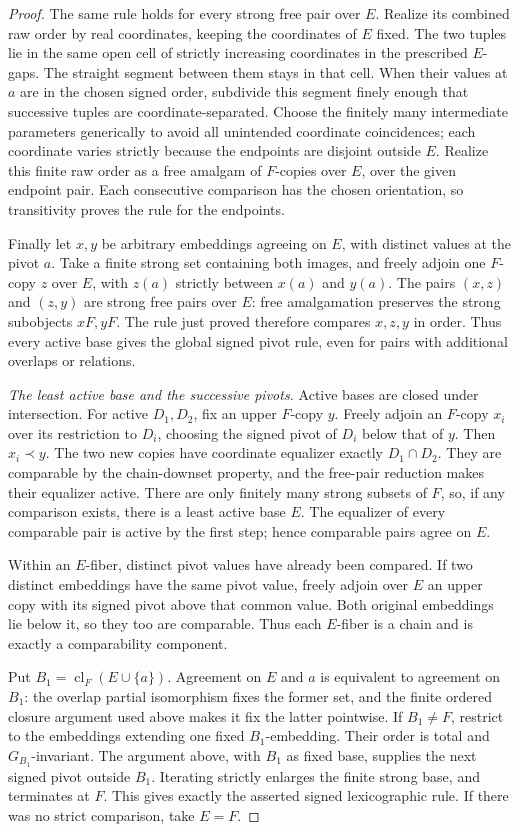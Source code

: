 \begin{proof}
The same rule holds for every strong free pair over $E$.
Realize its combined raw order by real coordinates, keeping
the coordinates of $E$ fixed. The two tuples lie in the same
open cell of strictly increasing coordinates in the prescribed
$E$-gaps. The straight segment between them stays in that cell.
When their values at $a$ are in the chosen signed order,
subdivide this segment finely enough that successive tuples
are coordinate-separated. Choose the finitely many intermediate
parameters generically to avoid all unintended coordinate
coincidences; each coordinate varies strictly because the
endpoints are disjoint outside $E$. Realize this finite raw
order as a free amalgam of $F$-copies over $E$, over the given
endpoint pair. Each consecutive comparison has the chosen
orientation, so transitivity proves the rule for the endpoints.

Finally let $x,y$ be arbitrary embeddings agreeing on $E$,
with distinct values at the pivot $a$. Take a finite strong
set containing both images, and freely adjoin one $F$-copy
$z$ over $E$, with $z(a)$ strictly between $x(a)$ and $y(a)$.
The pairs $(x,z)$ and $(z,y)$ are strong free pairs over $E$:
free amalgamation preserves the strong subobjects $xF,yF$.
The rule just proved therefore compares $x,z,y$ in order.
Thus every active base gives the global signed pivot rule,
even for pairs with additional overlaps or relations.

\emph{The least active base and the successive pivots.}
Active bases are closed under intersection. For active
$D_1,D_2$, fix an upper $F$-copy $y$. Freely adjoin an
$F$-copy $x_i$ over its restriction to $D_i$, choosing the
signed pivot of $D_i$ below that of $y$. Then $x_i\prec y$.
The two new copies have coordinate equalizer exactly
$D_1\cap D_2$. They are comparable by the chain-downset
property, and the free-pair reduction makes their equalizer
active. There are only finitely many strong subsets of $F$,
so, if any comparison exists, there is a least active base $E$.
The equalizer of every comparable pair is active by the
first step; hence comparable pairs agree on $E$.

Within an $E$-fiber, distinct pivot values have already been
compared. If two distinct embeddings have the same pivot
value, freely adjoin over $E$ an upper copy with its signed
pivot above that common value. Both original embeddings
lie below it, so they too are comparable. Thus each
$E$-fiber is a chain and is exactly a comparability component.

Put $B_1=\operatorname{cl}_F(E\cup\{a\})$.
Agreement on $E$ and $a$ is equivalent to agreement on $B_1$:
the overlap partial isomorphism fixes the former set, and
the finite ordered closure argument used above makes it
fix the latter pointwise. If $B_1\ne F$, restrict to the
embeddings extending one fixed $B_1$-embedding. Their order
is total and $G_{B_1}$-invariant. The argument above, with
$B_1$ as fixed base, supplies the next signed pivot outside
$B_1$. Iterating strictly enlarges the finite strong base,
and terminates at $F$. This gives exactly the asserted
signed lexicographic rule. If there was no strict comparison,
take $E=F$.
\end{proof}

